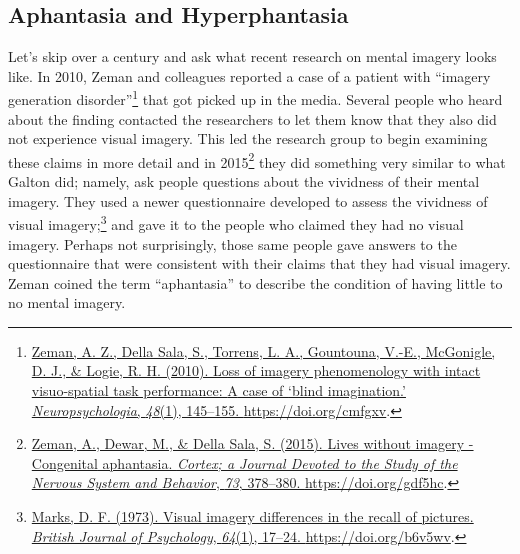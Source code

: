 \documentclass[
  oneside,
  12pt]{crumpbook}
\begin{document}
\hypertarget{aphantasia-and-hyperphantasia}{%
\subsection{Aphantasia and Hyperphantasia}\label{aphantasia-and-hyperphantasia}}

Let's skip over a century and ask what recent research on mental imagery looks like. In 2010, Zeman and colleagues reported a case of a patient with ``imagery generation disorder''\footnote{\protect\hyperlink{ref-zemanLossImageryPhenomenology2010}{Zeman, A. Z., Della Sala, S., Torrens, L. A., Gountouna, V.-E., McGonigle, D. J., \& Logie, R. H. (2010). Loss of imagery phenomenology with intact visuo-spatial task performance: {A} case of {`blind imagination.'} \emph{Neuropsychologia}, \emph{48}(1), 145--155. \url{https://doi.org/cmfgxv}}.} that got picked up in the media. Several people who heard about the finding contacted the researchers to let them know that they also did not experience visual imagery. This led the research group to begin examining these claims in more detail and in 2015\footnote{\protect\hyperlink{ref-zemanLivesImageryCongenital2015}{Zeman, A., Dewar, M., \& Della Sala, S. (2015). Lives without imagery - {Congenital} aphantasia. \emph{Cortex; a Journal Devoted to the Study of the Nervous System and Behavior}, \emph{73}, 378--380. \url{https://doi.org/gdf5hc}}.} they did something very similar to what Galton did; namely, ask people questions about the vividness of their mental imagery. They used a newer questionnaire developed to assess the vividness of visual imagery;\footnote{\protect\hyperlink{ref-marksVisualImageryDifferences1973}{Marks, D. F. (1973). Visual imagery differences in the recall of pictures. \emph{British Journal of Psychology}, \emph{64}(1), 17--24. \url{https://doi.org/b6v5wv}}.} and gave it to the people who claimed they had no visual imagery. Perhaps not surprisingly, those same people gave answers to the questionnaire that were consistent with their claims that they had visual imagery. Zeman coined the term ``aphantasia'' to describe the condition of having little to no mental imagery.
\end{document}

